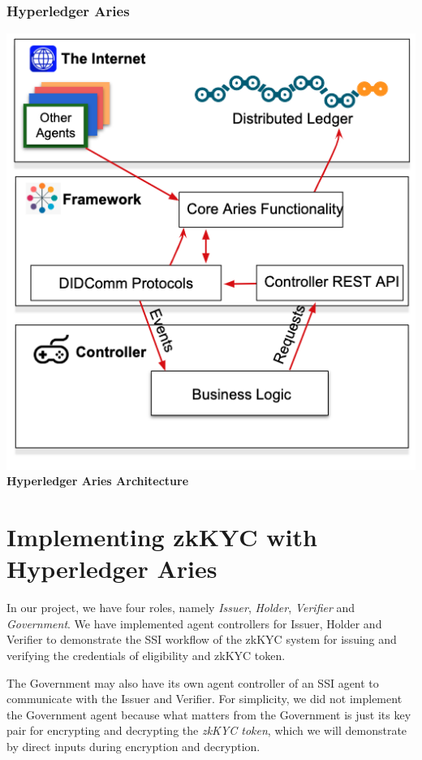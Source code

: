 \documentclass[
]{report}
\begin{document}
\subsubsection{Hyperledger Aries}

\includegraphics{aca-py.png} \textbf{Hyperledger Aries Architecture}

\section{Implementing zkKYC with Hyperledger Aries}

In our project, we have four roles, namely \emph{Issuer}, \emph{Holder},
\emph{Verifier} and \emph{Government}. We have implemented agent controllers
for Issuer, Holder and Verifier to demonstrate the SSI workflow of the
zkKYC system for issuing and verifying the credentials of eligibility and
zkKYC token.

The Government may also have its own agent controller of
an SSI agent to communicate with the Issuer and Verifier. For simplicity,
we did not implement the Government agent because what matters from the
Government is just its key pair for encrypting and decrypting the
\emph{zkKYC token}, which we will demonstrate by direct inputs during
encryption and decryption.
\end{document}
